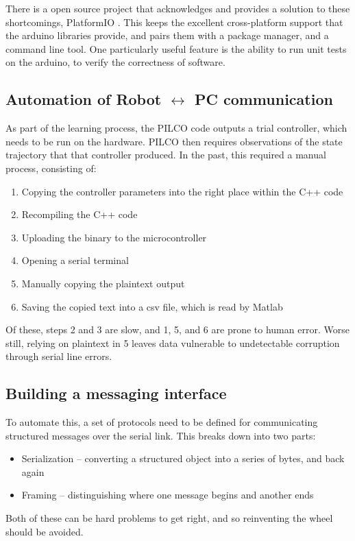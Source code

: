 \documentclass[main.tex]{subfiles}
\begin{document}
	There is a open source project that acknowledges and provides a solution to these shortcomings, PlatformIO \cite{platformio}.
	This keeps the excellent cross-platform support that the arduino libraries provide, and pairs them with a package manager, and a command line tool.
	One particularly useful feature is the ability to run unit tests on the arduino, to verify the correctness of software.

\subsection{Automation of Robot $\leftrightarrow$ PC communication}
	As part of the learning process, the PILCO code outputs a trial controller, which needs to be run on the hardware.
	PILCO then requires observations of the state trajectory that that controller produced.
	In the past, this required a manual process, consisting of:
	\begin{enumerate}
		\item Copying the controller parameters into the right place within the C++ code
		\item Recompiling the C++ code
		\item Uploading the binary to the microcontroller
		\item Opening a serial terminal
		\item Manually copying the plaintext output
		\item Saving the copied text into a csv file, which is read by Matlab
	\end{enumerate}
	Of these, steps 2 and 3 are slow, and 1, 5, and 6 are prone to human error.
	 Worse still, relying on plaintext in 5 leaves data vulnerable to undetectable corruption through serial line errors\footnotemark.



\subsection{Building a messaging interface}

	To automate this, a set of protocols need to be defined for communicating structured messages over the serial link.
	This breaks down into two parts:
	\begin{itemize}
		\item Serialization – converting a structured object into a series of bytes, and back again
		\item Framing – distinguishing where one message begins and another ends
	\end{itemize}
	Both of these can be hard problems to get right, and so reinventing the wheel should be avoided.
\end{document}
